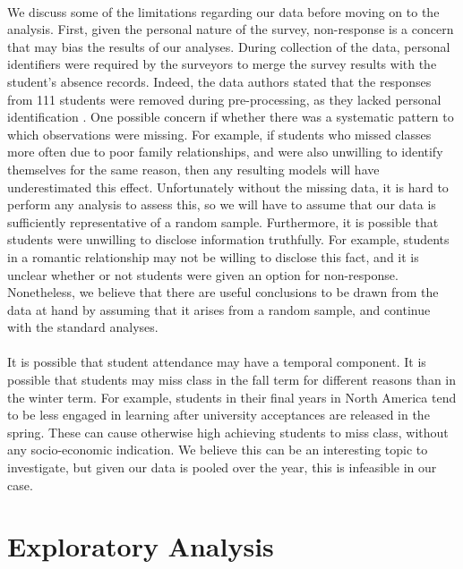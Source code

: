 \documentclass[12pt, titlepage]{article}
\begin{document}
	\paragraph{} We discuss some of the limitations regarding our data before moving on to the analysis. First, given the personal nature of the survey, non-response is a concern that may bias the results of our analyses. During collection of the data, personal identifiers were required by the surveyors to merge the survey results with the student's absence records. Indeed, the data authors stated that the responses from 111 students were removed during pre-processing, as they lacked personal identification \cite{Cortez::2008}. One possible concern if whether there was a systematic pattern to which observations were missing. For example, if students who missed classes more often due to poor family relationships, and were also unwilling to identify themselves for the same reason, then any resulting models will have underestimated this effect. Unfortunately without the missing data, it is hard to perform any analysis to assess this, so we will have to assume that our data is sufficiently representative of a random sample. Furthermore, it is possible that students were unwilling to disclose information truthfully. For example, students in a romantic relationship may not be willing to disclose this fact, and it is unclear whether or not students were given an option for non-response. Nonetheless, we believe that there are useful conclusions to be drawn from the data at hand by assuming that it arises from a random sample, and continue with the standard analyses. 
	
	\paragraph{} It is possible that student attendance may have a temporal component. It is possible that students may miss class in the fall term for different reasons than in the winter term. For example, students in their final years in North America tend to be less engaged in learning after university acceptances are released in the spring. These can cause otherwise high achieving students to miss class, without any socio-economic indication. We believe this can be an interesting topic to investigate, but given our data is pooled over the year, this is infeasible in our case. 
	
	\section{Exploratory Analysis}
	
\end{document}
